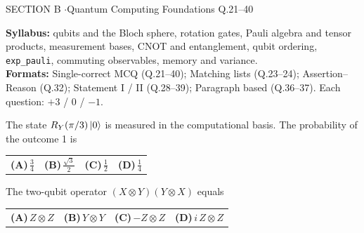 \documentclass[11pt,a4paper]{article}
\newcommand{\optlabel}[1]{\textbf{(#1)}}
\newenvironment{qitem}[1]{\begin{list}{}{\setlength{\leftmargin}{3.3em}\setlength{\labelwidth}{3.1em}%
  \setlength{\labelsep}{0.2em}\setlength{\topsep}{3pt}\setlength{\parsep}{3pt}}\item[\textbf{Q.#1}\hfill]}{\end{list}}
\newcommand{\qsep}{\par\vspace{2pt}{\color{black!15}\hrule}\vspace{4pt}}
\begin{document}
\newpage

\begin{sectionbanner}SECTION B \enspace$\cdot$\enspace Quantum Computing Foundations \hfill Q.21--40\end{sectionbanner}

{\small \textbf{Syllabus:} qubits and the Bloch sphere, rotation gates, Pauli algebra and tensor products, measurement bases, CNOT and entanglement, qubit ordering, \texttt{exp\_pauli}, commuting observables, memory and variance.\\ \textbf{Formats:} Single-correct MCQ (Q.21--40); Matching lists (Q.23--24); Assertion--Reason (Q.32); Statement I / II (Q.28--39); Paragraph based (Q.36--37). Each question: $+3$ / $0$ / $-1$.}
\par\medskip

\begin{qitem}{21}
The state $R_Y(\pi/3)\ket0$ is measured in the computational basis. The probability of the outcome 1 is
\par\smallskip\noindent\begin{tabularx}{\linewidth}{@{}*{4}{L}@{}}
\optlabel{A}\,$\tfrac34$ & \optlabel{B}\,$\tfrac{\sqrt3}{2}$ & \optlabel{C}\,$\tfrac12$ & \optlabel{D}\,$\tfrac14$
\end{tabularx}
\end{qitem}
\qsep

\begin{qitem}{22}
The two-qubit operator $(X\otimes Y)(Y\otimes X)$ equals
\par\smallskip\noindent\begin{tabularx}{\linewidth}{@{}*{4}{L}@{}}
\optlabel{A}\,$Z\otimes Z$ & \optlabel{B}\,$Y\otimes Y$ & \optlabel{C}\,$-Z\otimes Z$ & \optlabel{D}\,$i\,Z\otimes Z$
\end{tabularx}
\end{qitem}
\qsep
\end{document}
